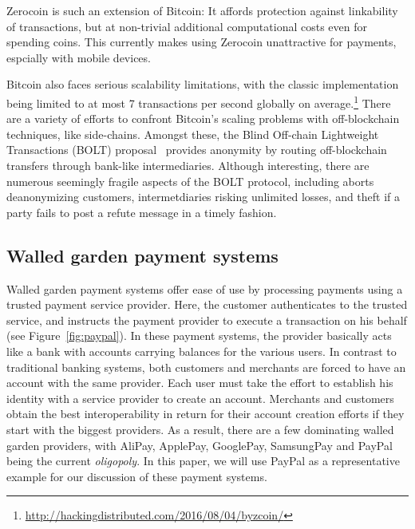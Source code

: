 \documentclass{llncs}
\begin{document}
Zerocoin \cite{miers2013zerocoin} is such an extension of Bitcoin:
It affords protection against linkability of transactions,
but at non-trivial additional computational costs even for
spending coins.  This currently makes using Zerocoin unattractive
for payments, espcially with mobile devices.

Bitcoin also faces serious scalability limitations, with the classic
implementation being limited to at most 7 transactions per second
globally on
average.\footnote{\url{http://hackingdistributed.com/2016/08/04/byzcoin/}}
There are a variety of efforts to confront Bitcoin's scaling problems
with off-blockchain techniques, like side-chains. %
Amongst these, the Blind Off-chain Lightweight Transactions (BOLT)
proposal~\cite{BOLT} provides anonymity by routing off-blockchain
transfers through bank-like intermediaries.  Although interesting,
there are numerous seemingly fragile aspects of the BOLT protocol,
including aborts deanonymizing customers, intermetdiaries risking
unlimited losses, and theft if a party fails to post a refute message
in a timely fashion.  






\subsection{Walled garden payment systems}

Walled garden payment systems offer ease of use by processing payments
using a trusted payment service provider. Here, the customer
authenticates to the trusted service, and instructs the payment
provider to execute a transaction on his behalf
(see Figure~\ref{fig:paypal}).  In these payment systems, the provider
basically acts like a bank with accounts carrying balances for the
various users.  In contrast to traditional banking systems, both
customers and merchants are forced to have an account with the same
provider.  Each user must take the effort to establish his identity
with a service provider to create an account.  Merchants and customers
obtain the best interoperability in return for their account creation
efforts if they start with the biggest providers.  As a result, there
are a few dominating walled garden providers, with AliPay, ApplePay,
GooglePay, SamsungPay and PayPal being the current {\em oligopoly}.  In this
paper, we will use PayPal as a representative example for our discussion
of these payment systems.
\end{document}
